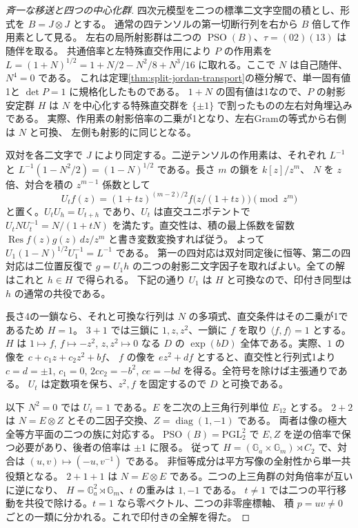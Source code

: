 \begin{proof}[斉一な移送と四つの中心化群]
四次元模型を二つの標準二文字空間の積とし、形式を $B=J\otimes J$ とする。
通常の四テンソルの第一切断行列を右から $B$ 倍して作用素として見る。
左右の局所射影群は二つの $\operatorname{PSO}(B)$、$\tau=(02)(13)$ は随伴を取る。
共通倍率と左特殊直交作用により $P$ の作用素を
$L=(1+N)^{1/2}=1+N/2-N^2/8+N^3/16$ に取れる。ここで $N$ は自己随伴、$N^4=0$ である。
これは定理\ref{thm:split-jordan-transport}の極分解で、単一固有値1と $\det P=1$ に規格化したものである。
$1+N$ の固有値は1なので、$P$ の射影安定群 $H$ は
$N$ を中心化する特殊直交群を $\{\pm1\}$ で割ったものの左右対角埋込みである。
実際、作用素の射影倍率の二乗が1となり、左右Gramの等式から右側は $N$ と可換、
左側も射影的に同じとなる。

双対を各二文字で $J$ により同定する。二逆テンソルの作用素は、それぞれ $L^{-1}$ と
$L^{-1}(1-N^2/2)=(1-N)^{1/2}$ である。長さ $m$ の鎖を $k[z]/z^m$、
$N$ を $z$ 倍、対合を積の $z^{m-1}$ 係数として
\[
 U_t f(z)=(1+tz)^{(m-2)/2} f\big(z/(1+tz)\big)\pmod {z^m}
\]
と置く。$U_tU_h=U_{t+h}$ であり、$U_t$ は直交ユニポテントで
$U_tNU_t^{-1}=N/(1+tN)$ を満たす。直交性は、積の最上係数を留数
$\operatorname{Res} f(z)g(z)\,dz/z^m$ と書き変数変換すれば従う。
よって $U_1(1-N)^{1/2}U_1^{-1}=L^{-1}$ である。
第一の四対応は双対同定後に恒等、第二の四対応は二位置反復で
$g=U_1h$ の二つの射影二文字因子を取ればよい。全ての解はこれと $h\in H$ で得られる。
下記の通り $U_1$ は $H$ と可換なので、印付き同型は $h$ の通常の共役である。

長さ4の一鎖なら、それと可換な行列は $N$ の多項式、直交条件はその二乗が1であるため $H=1$。
$3+1$ では三鎖に $1,z,z^2$、一鎖に $f$ を取り $\langle f,f\rangle=1$ とする。
$H$ は $1\mapsto f$, $f\mapsto-z^2$, $z,z^2\mapsto0$ なる $D$ の
$\exp(bD)$ 全体である。実際、$1$ の像を $c+c_1z+c_2z^2+b f$、
$f$ の像を $e z^2+d f$ とすると、直交性と行列式1より
$c=d=\pm1$, $c_1=0$, $2cc_2=-b^2$, $ce=-bd$ を得る。全符号を除けば主張通りである。
$U_t$ は定数項を保ち、$z^2,f$ を固定するので $D$ と可換である。

以下 $N^2=0$ では $U_t=1$ である。$E$ を二次の上三角行列単位 $E_{12}$ とする。
$2+2$ は $N=E\otimes Z$ とその二因子交換、$Z=\operatorname{diag}(1,-1)$ である。
両者は像の極大全等方平面の二つの族に対応する。$\operatorname{PSO}(B)=\mathrm{PGL}_2^2$ で
$E,Z$ を逆の倍率で保つ必要があり、後者の倍率は $\pm1$ に限る。
従って $H=(\mathbb G_a\times\mathbb G_m)\rtimes C_2$ で、対合は $(u,v)\mapsto(-u,v^{-1})$ である。
非恒等成分は平方写像の全射性から単一共役類となる。
$2+1+1$ は $N=E\otimes E$ である。二つの上三角群の対角倍率が互いに逆になり、
$H=\mathbb G_a^2\rtimes\mathbb G_m$、$t$ の重みは $1,-1$ である。
$t\ne1$ では二つの平行移動を共役で除ける。$t=1$ なら零ベクトル、二つの非零座標軸、
積 $p=uv\ne0$ ごとの一類に分かれる。これで印付きの全解を得た。
\end{proof}


